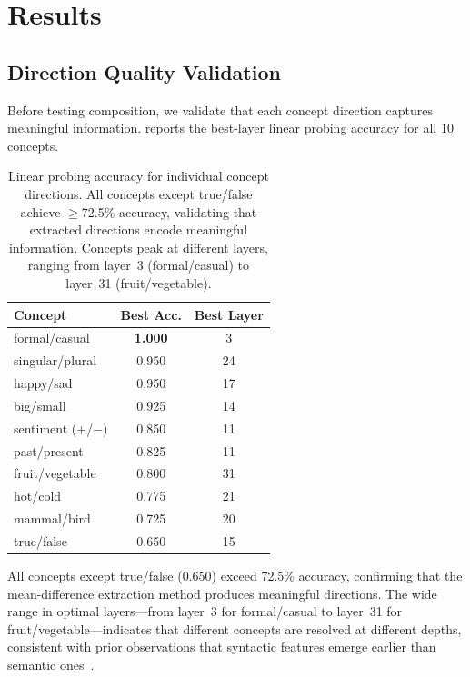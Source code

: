 \section{Results}
\label{sec:results}

\subsection{Direction Quality Validation}
\label{sec:direction_quality}

Before testing composition, we validate that each concept direction captures
meaningful information.  reports the best-layer linear
probing accuracy for all 10 concepts.

\begin{table}[t]
    \centering
    \caption{Linear probing accuracy for individual concept directions. All
    concepts except true/false achieve $\geq$72.5\% accuracy, validating that
    extracted directions encode meaningful information. Concepts peak at
    different layers, ranging from layer~3 (formal/casual) to layer~31
    (fruit/vegetable).}
    \begin{tabular}{@{}lcc@{}}
        \toprule
        \textbf{Concept} & \textbf{Best Acc.} & \textbf{Best Layer} \\
        \midrule
        formal/casual     & \textbf{1.000} & 3  \\
        singular/plural   & 0.950 & 24 \\
        happy/sad         & 0.950 & 17 \\
        big/small         & 0.925 & 14 \\
        sentiment (+/$-$) & 0.850 & 11 \\
        past/present      & 0.825 & 11 \\
        fruit/vegetable   & 0.800 & 31 \\
        hot/cold          & 0.775 & 21 \\
        mammal/bird       & 0.725 & 20 \\
        true/false        & 0.650 & 15 \\
        \bottomrule
    \end{tabular}
    \label{tab:probing}
\end{table}

All concepts except true/false ($0.650$) exceed 72.5\% accuracy, confirming
that the mean-difference extraction method produces meaningful directions. The
wide range in optimal layers---from layer~3 for formal/casual to layer~31 for
fruit/vegetable---indicates that different concepts are resolved at different
depths, consistent with prior observations that syntactic features emerge
earlier than semantic ones~\citep{stolfo2024improving}.

